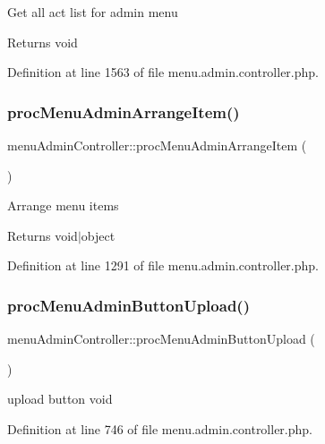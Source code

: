 Get all act list for admin menu \begin{DoxyReturn}{Returns}
void 
\end{DoxyReturn}


Definition at line 1563 of file menu.\+admin.\+controller.\+php.

\mbox{\label{classmenuAdminController_ac803e1a5fb5bf35e30f20d727afb89dd}} 
\subsubsection{\texorpdfstring{proc\+Menu\+Admin\+Arrange\+Item()}{procMenuAdminArrangeItem()}}
{\footnotesize\ttfamily menu\+Admin\+Controller\+::proc\+Menu\+Admin\+Arrange\+Item (\begin{DoxyParamCaption}{ }\end{DoxyParamCaption})}

Arrange menu items \begin{DoxyReturn}{Returns}
void$\vert$object 
\end{DoxyReturn}


Definition at line 1291 of file menu.\+admin.\+controller.\+php.

\mbox{\label{classmenuAdminController_a733cac454885536a8cd2d1b5c625109a}} 
\subsubsection{\texorpdfstring{proc\+Menu\+Admin\+Button\+Upload()}{procMenuAdminButtonUpload()}}
{\footnotesize\ttfamily menu\+Admin\+Controller\+::proc\+Menu\+Admin\+Button\+Upload (\begin{DoxyParamCaption}{ }\end{DoxyParamCaption})}

upload button  void 

Definition at line 746 of file menu.\+admin.\+controller.\+php.

